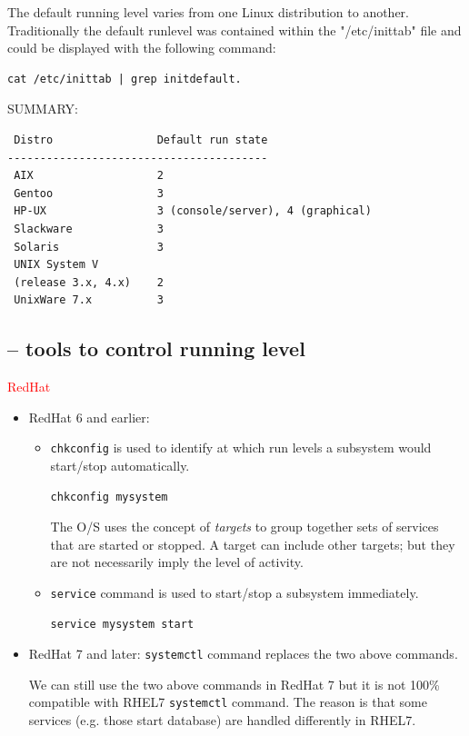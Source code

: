 



The default running level varies from one Linux distribution to another.
Traditionally the default runlevel was contained within the "/etc/inittab" file
and could be displayed with the following command:
\begin{verbatim}
cat /etc/inittab | grep initdefault.
\end{verbatim}

SUMMARY:
\begin{verbatim}
 Distro                Default run state
----------------------------------------
 AIX                   2
 Gentoo                3
 HP-UX                 3 (console/server), 4 (graphical)
 Slackware             3
 Solaris               3
 UNIX System V 
 (release 3.x, 4.x)    2
 UnixWare 7.x          3
\end{verbatim} 


\subsection{-- tools to control running level}
\label{sec:running-level-tools} 

\textcolor{red}{RedHat}
\begin{itemize}
  \item  RedHat 6 and earlier:
  
\begin{itemize}
  \item \verb!chkconfig! is used to identify at which run levels a
  subsystem would start/stop automatically.

\begin{verbatim}
chkconfig mysystem
\end{verbatim}  

  The O/S uses the concept of {\it targets} to group together sets of services 
  that are started or stopped. A target can include other targets; but they are
  not necessarily imply the level of activity.
  

  \item \verb!service! command is used to start/stop a subsystem
  immediately.

\begin{verbatim}
service mysystem start
\end{verbatim}  
\end{itemize}

  \item RedHat 7 and later: \verb!systemctl! command replaces the two above
  commands.
  
  We can still use the two above commands in RedHat 7 but it is not 100\%
  compatible with RHEL7 \verb!systemctl! command. The reason is that some
  services (e.g. those start database) are handled differently in RHEL7.
  
\end{itemize}

